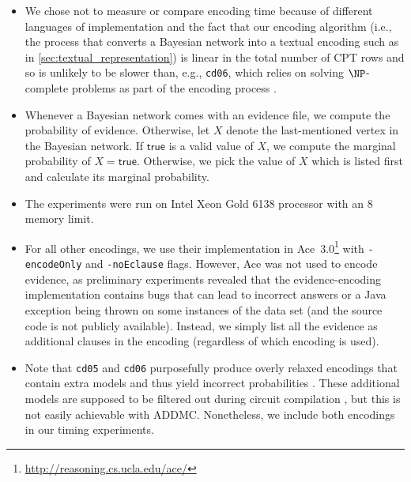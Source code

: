 \documentclass{article}
\theoremstyle{definition}
\theoremstyle{remark}
\begin{document}
{\begin{itemize}
\item We chose not to measure or compare encoding time because of different
  languages of implementation and the fact that our encoding algorithm (i.e.,
  the process that converts a Bayesian network into a textual encoding such as
  in \cref{sec:textual_representation}) is linear in the total number of CPT
  rows and so is unlikely to be slower than, e.g., \texttt{cd06}, which relies
  on solving $\NP$-complete problems as part of the encoding process
  \cite{DBLP:conf/sat/ChaviraD06}.
\item Whenever a Bayesian network comes with an evidence file, we compute the
  probability of evidence. Otherwise, let $X$ denote the last-mentioned vertex
  in the Bayesian network. If $\mathsf{true}$ is a valid value of $X$, we
  compute the marginal probability of $X = \mathsf{true}$. Otherwise, we pick
  the value of $X$ which is listed first and calculate its marginal probability.
\item The experiments were run on Intel Xeon Gold 6138 processor with an
  \SI{8}{\giga\byte} memory limit.
\item For all other encodings, we use their implementation in
  Ace~3.0\footnote{\url{http://reasoning.cs.ucla.edu/ace/}} with
  \texttt{-encodeOnly} and \texttt{-noEclause} flags. However, Ace was not used
  to encode evidence, as preliminary experiments revealed that the
  evidence-encoding implementation contains bugs that can lead to incorrect
  answers or a Java exception being thrown on some instances of the data set
  (and the source code is not publicly available). Instead, we simply list all
  the evidence as additional clauses in the encoding (regardless of which
  encoding is used).
\item Note that \texttt{cd05} and \texttt{cd06} purposefully produce overly
  relaxed encodings that contain extra models and thus yield incorrect
  probabilities \cite{DBLP:conf/ijcai/ChaviraD05,DBLP:conf/sat/ChaviraD06}.
  These additional models are supposed to be filtered out during circuit
  compilation \cite{DBLP:conf/ijcai/ChaviraD05}, but this is not easily
  achievable with ADDMC. Nonetheless, we include both encodings in our timing
  experiments.
\end{itemize}

}
\end{document}
